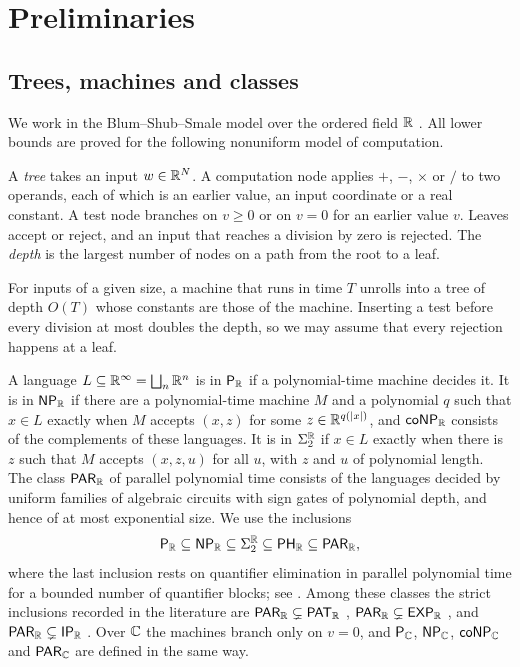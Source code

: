 \section{Preliminaries}\label{sec:prelim}

\subsection{Trees, machines and classes}\label{sec:trees}

We work in the Blum--Shub--Smale model over the ordered field $\mathbb{R}$ \cite{BSS89,BCSS98}. All lower bounds are proved for the following nonuniform model of computation.

\begin{definition}\label{def:tree}
A \emph{tree} takes an input $w\in\mathbb{R}^N$. A computation node applies $+$, $-$, $\times$ or $/$ to two operands, each of which is an earlier value, an input coordinate or a real constant. A test node branches on $v\ge 0$ or on $v=0$ for an earlier value $v$. Leaves accept or reject, and an input that reaches a division by zero is rejected. The \emph{depth} is the largest number of nodes on a path from the root to a leaf.
\end{definition}

For inputs of a given size, a machine that runs in time $T$ unrolls into a tree of depth $O(T)$ whose constants are those of the machine. Inserting a test before every division at most doubles the depth, so we may assume that every rejection happens at a leaf.

A language $L\subseteq\mathbb{R}^\infty=\bigsqcup_n\mathbb{R}^n$ is in $\textsf{\upshape P}_{\mathbb{R}}$ if a polynomial-time machine decides it. It is in $\textsf{\upshape NP}_{\mathbb{R}}$ if there are a polynomial-time machine $M$ and a polynomial $q$ such that $x\in L$ exactly when $M$ accepts $(x,z)$ for some $z\in\mathbb{R}^{q(|x|)}$, and $\textsf{\upshape coNP}_{\mathbb{R}}$ consists of the complements of these languages. It is in $\Sigma_2^{\mathbb{R}}$ if $x\in L$ exactly when there is $z$ such that $M$ accepts $(x,z,u)$ for all $u$, with $z$ and $u$ of polynomial length. The class $\textsf{\upshape PAR}_{\mathbb{R}}$ of parallel polynomial time consists of the languages decided by uniform families of algebraic circuits with sign gates of polynomial depth, and hence of at most exponential size. We use the inclusions
\[
\textsf{\upshape P}_{\mathbb{R}}\subseteq\textsf{\upshape NP}_{\mathbb{R}}\subseteq\Sigma_2^{\mathbb{R}}\subseteq\textsf{\upshape PH}_{\mathbb{R}}\subseteq\textsf{\upshape PAR}_{\mathbb{R}} ,
\]
where the last inclusion rests on quantifier elimination in parallel polynomial time for a bounded number of quantifier blocks; see \cite{Ren92,Cuc93,BCSS98}. Among these classes the strict inclusions recorded in the literature are $\textsf{\upshape PAR}_{\mathbb{R}}\subsetneq\textsf{\upshape PAT}_{\mathbb{R}}$ \cite{Cuc93,BCSS98}, $\textsf{\upshape PAR}_{\mathbb{R}}\subsetneq\textsf{\upshape EXP}_{\mathbb{R}}$ \cite{Cuc92,MM97}, and $\textsf{\upshape PAR}_{\mathbb{R}}\subsetneq\textsf{\upshape IP}_{\mathbb{R}}$ \cite{BM16}. Over $\mathbb{C}$ the machines branch only on $v=0$, and $\textsf{\upshape P}_{\mathbb{C}}$, $\textsf{\upshape NP}_{\mathbb{C}}$, $\textsf{\upshape coNP}_{\mathbb{C}}$ and $\textsf{\upshape PAR}_{\mathbb{C}}$ are defined in the same way.

